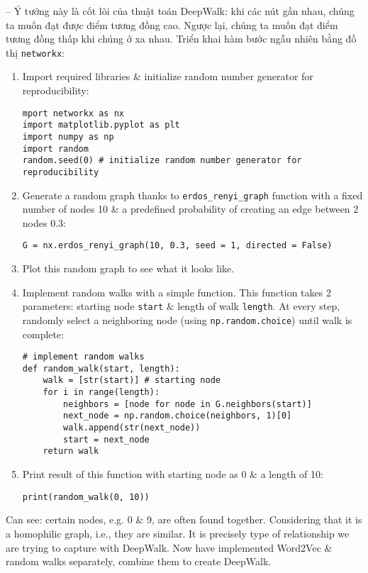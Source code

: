 \documentclass{article}
\begin{document}
\begin{itemize}
\begin{itemize}
        -- Ý tưởng này là cốt lõi của thuật toán DeepWalk: khi các nút gần nhau, chúng ta muốn đạt được điểm tương đồng cao. Ngược lại, chúng ta muốn đạt điểm tương đồng thấp khi chúng ở xa nhau. Triển khai hàm bước ngẫu nhiên bằng đồ thị {\tt networkx}:
        \begin{enumerate}
            \item Import required libraries \& initialize random number generator for reproducibility:
            \begin{verbatim}
mport networkx as nx
import matplotlib.pyplot as plt
import numpy as np
import random
random.seed(0) # initialize random number generator for reproducibility
            \end{verbatim}
            \item Generate a random graph thanks to \verb|erdos_renyi_graph| function with a fixed number of nodes 10 \& a predefined probability of creating an edge between 2 nodes 0.3:
            \begin{verbatim}
G = nx.erdos_renyi_graph(10, 0.3, seed = 1, directed = False)
            \end{verbatim}
            \item Plot this random graph to see what it looks like.
            \item Implement random walks with a simple function. This function takes 2 parameters: starting node {\tt start} \& length of walk {\tt length}. At every step, randomly select a neighboring node (using {\tt np.random.choice}) until walk is complete:
            \begin{verbatim}
# implement random walks
def random_walk(start, length):
    walk = [str(start)] # starting node
    for i in range(length):
        neighbors = [node for node in G.neighbors(start)]
        next_node = np.random.choice(neighbors, 1)[0]
        walk.append(str(next_node))
        start = next_node
    return walk
            \end{verbatim}
            \item Print result of this function with starting node as 0 \& a length of 10:
            \begin{verbatim}
print(random_walk(0, 10))
            \end{verbatim}
        \end{enumerate}
        Can see: certain nodes, e.g. 0 \& 9, are often found together. Considering that it is a homophilic graph, i.e., they are similar. It is precisely type of relationship we are trying to capture with DeepWalk. Now have implemented Word2Vec \& random walks separately, combine them to create DeepWalk.


\end{itemize}
\end{itemize}
\end{document}
